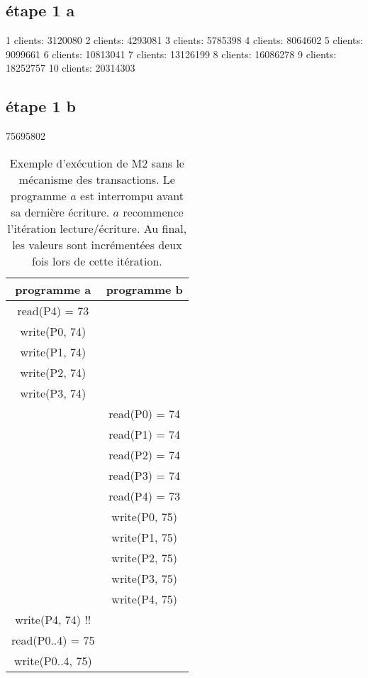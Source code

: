 \documentclass[a4paper,11pt]{article}
\begin{document}
\subsection*{étape 1 a}
1 clients: 3120080
2 clients: 4293081
3 clients: 5785398
4 clients: 8064602
5 clients: 9099661
6 clients: 10813041
7 clients: 13126199
8 clients: 16086278
9 clients: 18252757
10 clients: 20314303

\subsection*{étape 1 b}
75695802

\appendix

\begin{table}
\label{M2}
\caption{Exemple d'exécution de  M2  sans le mécanisme des transactions.
Le programme $a$ est interrompu avant sa dernière écriture. 
$a$ recommence l'itération lecture/écriture.
Au final, les valeurs sont incrémentées deux fois lors de cette itération.
}

\begin{center}
\begin{tabular}{|c|c|}
\hline 
programme a & programme b\tabularnewline
\hline 
\hline 
read(P4) = 73 & \tabularnewline
\hline 
write(P0, 74) & \tabularnewline
\hline 
write(P1, 74) & \tabularnewline
\hline 
write(P2, 74) & \tabularnewline
\hline 
write(P3, 74) & \tabularnewline
\hline 
 & read(P0) = 74\tabularnewline
\hline 
 & read(P1) = 74\tabularnewline
\hline 
 & read(P2) = 74\tabularnewline
\hline 
 & read(P3) = 74\tabularnewline
\hline 
 & read(P4) = 73\tabularnewline
\hline 
 & write(P0, 75)\tabularnewline
\hline 
 & write(P1, 75)\tabularnewline
\hline 
 & write(P2, 75)\tabularnewline
\hline 
 & write(P3, 75)\tabularnewline
\hline 
 & write(P4, 75)\tabularnewline
\hline 
write(P4, 74) !! & \tabularnewline
\hline 
read(P0..4) = 75 & \tabularnewline
\hline 
write(P0..4, 75) & \tabularnewline
\hline 
\end{tabular}
\end{center}
\end{table}
\end{document}
